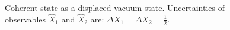 \begin{figure}
\centering



\caption{Coherent state as a displaced vacuum state. Uncertainties of observables $\hat{X}_1$ and $\hat{X}_2$ are: $\Delta X_1 = \Delta X_2 = \frac{1}{2}$.}
\label{figPart3Squeezed_6}
\end{figure}